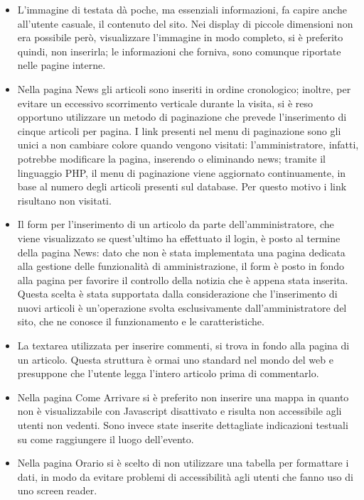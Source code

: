 \documentclass[10pt, a4paper]{article}
\begin{document}
\begin{itemize}
	\item{L’immagine di testata dà poche, ma essenziali informazioni, fa capire anche all’utente casuale, il contenuto del sito. Nei display di piccole dimensioni non era possibile però, visualizzare l'immagine in modo completo, si è preferito quindi, non inserirla; le informazioni che forniva, sono comunque riportate nelle pagine interne.}
	\item{Nella pagina News gli articoli sono inseriti in ordine cronologico; inoltre, per evitare un eccessivo scorrimento verticale durante la visita, si è reso opportuno utilizzare un metodo di paginazione che prevede l’inserimento di cinque articoli per pagina. I link presenti nel menu di paginazione sono gli unici a non cambiare colore quando vengono visitati: l’amministratore, 			infatti, potrebbe modificare la pagina, inserendo o eliminando news; tramite il linguaggio PHP, il menu di paginazione viene aggiornato continuamente, in base al numero degli articoli presenti sul database. Per questo motivo i link risultano non visitati.}
	\item{Il form per l'inserimento di un articolo da parte dell'amministratore, che viene visualizzato se quest'ultimo ha effettuato il login, è posto al termine della pagina News: dato che non è stata implementata una pagina dedicata alla gestione delle funzionalità di amministrazione, il form è posto in fondo alla pagina per favorire il controllo della notizia che è appena stata inserita. Questa scelta è stata supportata dalla considerazione che l'inserimento di nuovi articoli è un'operazione svolta esclusivamente dall'amministratore del sito, che ne conosce il funzionamento e le caratteristiche.}	
	\item{La textarea utilizzata per inserire commenti, si trova in fondo alla pagina di un articolo. Questa struttura è ormai uno standard nel mondo del web e presuppone che l'utente legga l’intero articolo prima di commentarlo.}
	\item{Nella pagina Come Arrivare si è preferito non inserire una mappa in quanto non è visualizzabile con Javascript disattivato e risulta non accessibile agli utenti non vedenti. Sono invece state inserite dettagliate indicazioni testuali su come raggiungere il luogo dell'evento.}
	\item{Nella pagina Orario si è scelto di non utilizzare una tabella per formattare i dati, in modo da evitare problemi di accessibilità agli utenti che fanno uso di uno screen reader.}
\end{itemize}
\end{document}
